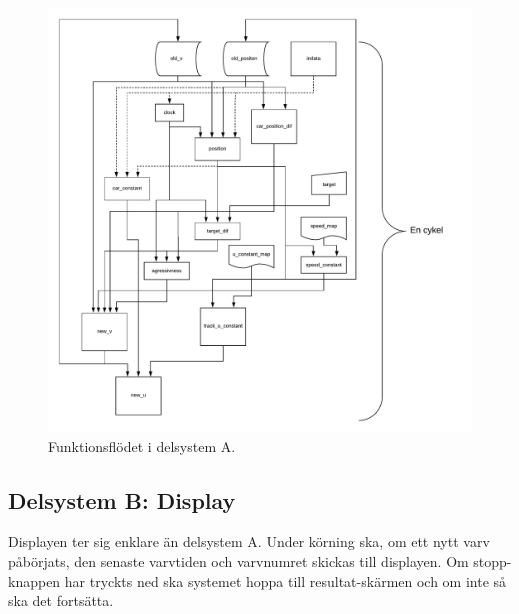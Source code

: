 	\begin{figure}
  	\centering
    \includegraphics[width=\linewidth]{figures/flow.pdf}
  	\caption{Funktionsflödet i delsystem A.}%
  	\label{fig:flow_diagram}
	\end{figure}

  \subsection{Delsystem B: Display}

  Displayen ter sig enklare än delsystem A. Under körning ska, om ett nytt varv
  påbörjats, den senaste varvtiden och varvnumret skickas till displayen. Om
  stopp-knappen har tryckts ned ska systemet hoppa till resultat-skärmen och om
  inte så ska det fortsätta.

